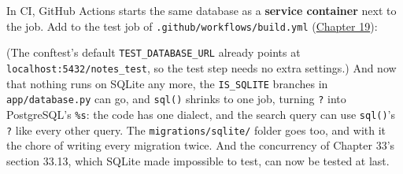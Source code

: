 \noindent{}In CI, GitHub Actions starts the same database as a \textbf{service container} next to the job. Add to the test job of \texttt{.}\allowbreak{}\texttt{github/}\allowbreak{}\texttt{workflows/}\allowbreak{}\texttt{build.}\allowbreak{}\texttt{yml} (\hyperref[ch:19-artifact-storage]{Chapter 19}):

\begin{codebox}[short]

\begin{Shaded}
\begin{Highlighting}[]
\AttributeTok{    }\KeywordTok{:}
\AttributeTok{      }\KeywordTok{:}
\AttributeTok{        }\KeywordTok{:}
\AttributeTok{        }\KeywordTok{:}
\AttributeTok{          }\KeywordTok{:}
\AttributeTok{          }\KeywordTok{:}
\AttributeTok{          }\KeywordTok{:}
\AttributeTok{        }\KeywordTok{:}
\AttributeTok{          }\KeywordTok{{-}}\AttributeTok{ }
\KeywordTok{: }\CharTok{\textgreater{}{-}}
\end{Highlighting}
\end{Shaded}

\end{codebox}

\noindent{}(The conftest's default \texttt{TEST\_DATABASE\_URL} already points at \texttt{localhost:}\allowbreak{}\texttt{5432/}\allowbreak{}\texttt{notes\_}\allowbreak{}\texttt{test}, so the test step needs no extra settings.) And now that nothing runs on SQLite any more, the \texttt{IS\_SQLITE} branches in \texttt{app/database.py} can go, and \texttt{sql()} shrinks to one job, turning \texttt{?} into PostgreSQL's \texttt{\%s}: the code has one dialect, and the search query can use \texttt{sql()}'s \texttt{?} like every other query. The \texttt{migrations/}\allowbreak{}\texttt{sqlite/} folder goes too, and with it the chore of writing every migration twice. And the concurrency of Chapter 33's section 33.13, which SQLite made impossible to test, can now be tested at last.

